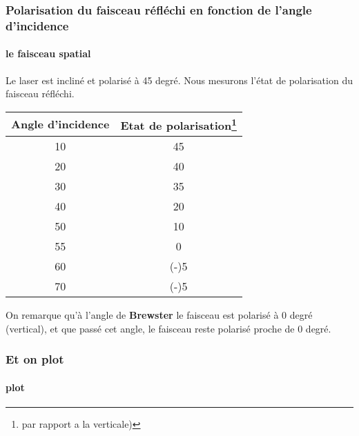 \documentclass{beamer}
\begin{document}
\begin{frame}
\frametitle{Polarisation du faisceau réfléchi en fonction de l'angle d'incidence}
\framesubtitle{le faisceau spatial}
Le laser est incliné et polarisé à 45 degré. Nous mesurons l'état de polarisation du faisceau réfléchi.
\begin{tabular}{|c|c|}
	\hline
		Angle d'incidence & Etat de polarisation\footnote{par rapport a la verticale)} \\
	\hline
		10 & 45 \\
		20 & 40 \\
		30 & 35 \\ 
		40 & 20 \\
		50 & 10 \\
		55 & 0 \\
		60 & (-)5 \\
		70 & (-)5 \\
	\hline
	\end{tabular}
	\newline On remarque qu'à l'angle de \textbf{Brewster} le faisceau est polarisé à 0 degré (vertical), et que passé cet angle, le faisceau reste polarisé proche de 0 degré.
\end{frame}

\begin{frame}
\frametitle{Et on plot}
\framesubtitle{plot}

\end{frame}
\end{document}

